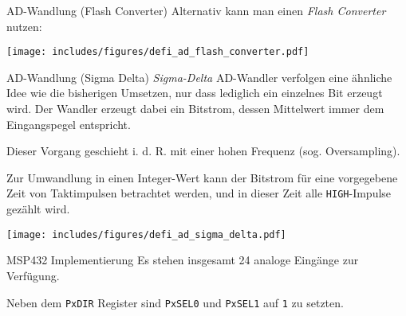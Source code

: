 \begin{defi}{AD-Wandlung (Flash Converter)}
    Alternativ kann man einen \emph{Flash Converter} nutzen:

    \begin{center}
        \texttt{[image: includes/figures/defi\_ad\_flash\_converter.pdf]}
    \end{center}
\end{defi}

\begin{defi}{AD-Wandlung (Sigma Delta)}
    \emph{Sigma-Delta} AD-Wandler verfolgen eine ähnliche Idee wie die bisherigen Umsetzen, nur dass lediglich ein einzelnes Bit erzeugt wird.
    Der Wandler erzeugt dabei ein Bitstrom, dessen Mittelwert immer dem Eingangspegel entspricht.

    Dieser Vorgang geschieht i. d. R. mit einer hohen Frequenz (sog. Oversampling).

    Zur Umwandlung in einen Integer-Wert kann der Bitstrom für eine vorgegebene Zeit von Taktimpulsen betrachtet werden, und in dieser Zeit alle \texttt{HIGH}-Impulse gezählt wird.

    \begin{center}
        \texttt{[image: includes/figures/defi\_ad\_sigma\_delta.pdf]}
    \end{center}
\end{defi}

\begin{bonus}{MSP432 Implementierung}
    Es stehen insgesamt 24 analoge Eingänge zur Verfügung.

    Neben dem \texttt{PxDIR} Register sind \texttt{PxSEL0} und \texttt{PxSEL1} auf \texttt{1} zu setzten.
\end{bonus}